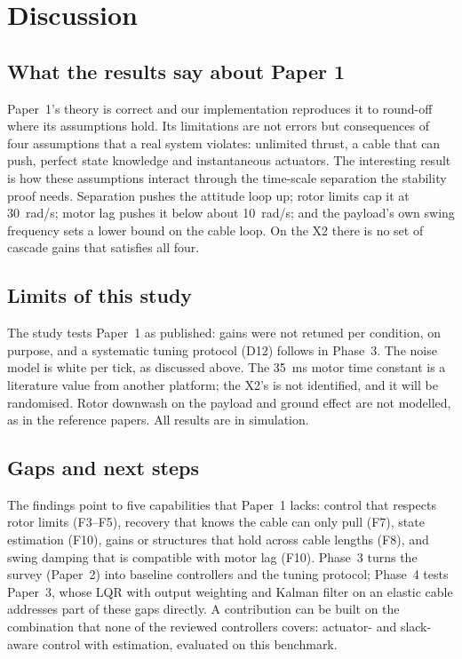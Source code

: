 \documentclass[11pt,a4paper]{article}
\begin{document}
\section{Discussion}

\subsection{What the results say about Paper 1}
Paper~1's theory is correct and our implementation reproduces it to round-off where its assumptions hold. Its
limitations are not errors but consequences of four assumptions that a real system violates: unlimited thrust, a cable
that can push, perfect state knowledge and instantaneous actuators. The interesting result is how these assumptions
interact through the time-scale separation the stability proof needs. Separation pushes the attitude loop up; rotor limits
cap it at 30~rad/s; motor lag pushes it below about 10~rad/s; and the payload's own swing frequency sets a lower bound on
the cable loop. On the X2 there is no set of cascade gains that satisfies all four.

\subsection{Limits of this study}
The study tests Paper~1 as published: gains were not retuned per condition, on purpose, and a systematic tuning protocol
(D12) follows in Phase~3. The noise model is white per tick, as discussed above. The 35~ms motor time constant is a literature
value from another platform; the X2's is not identified, and it will be randomised. Rotor downwash on the payload and
ground effect are not modelled, as in the reference papers. All results are in simulation.

\subsection{Gaps and next steps}
The findings point to five capabilities that Paper~1 lacks: control that respects rotor limits (F3--F5), recovery that
knows the cable can only pull (F7), state estimation (F10), gains or structures that hold across cable lengths (F8), and
swing damping that is compatible with motor lag (F10). Phase~3 turns the survey (Paper~2) into baseline controllers and the
tuning protocol; Phase~4 tests Paper~3, whose LQR with output weighting and Kalman filter on an elastic cable addresses
part of these gaps directly. A contribution can be built on the combination that none of the reviewed controllers covers:
actuator- and slack-aware control with estimation, evaluated on this benchmark.
\end{document}
